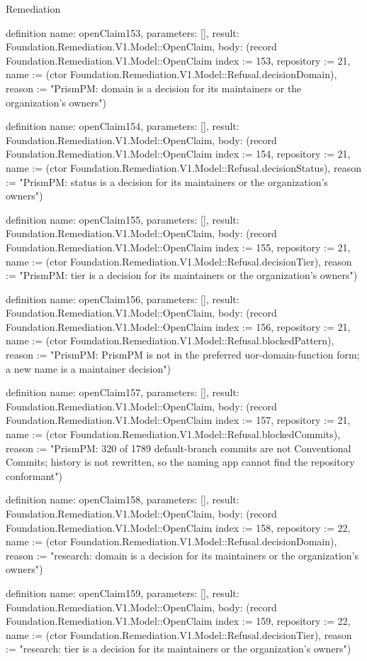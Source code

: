 \begin{lexlean}{Remediation}
\begin{semanticmodule}
definition{
  name: openClaim153,
  parameters: [],
  result: Foundation.Remediation.V1.Model::OpenClaim,
  body: (record Foundation.Remediation.V1.Model::OpenClaim {index := 153, repository := 21, name := (ctor Foundation.Remediation.V1.Model::Refusal.decisionDomain), reason := "PrismPM: domain is a decision for its maintainers or the organization's owners"})
}

definition{
  name: openClaim154,
  parameters: [],
  result: Foundation.Remediation.V1.Model::OpenClaim,
  body: (record Foundation.Remediation.V1.Model::OpenClaim {index := 154, repository := 21, name := (ctor Foundation.Remediation.V1.Model::Refusal.decisionStatus), reason := "PrismPM: status is a decision for its maintainers or the organization's owners"})
}

definition{
  name: openClaim155,
  parameters: [],
  result: Foundation.Remediation.V1.Model::OpenClaim,
  body: (record Foundation.Remediation.V1.Model::OpenClaim {index := 155, repository := 21, name := (ctor Foundation.Remediation.V1.Model::Refusal.decisionTier), reason := "PrismPM: tier is a decision for its maintainers or the organization's owners"})
}

definition{
  name: openClaim156,
  parameters: [],
  result: Foundation.Remediation.V1.Model::OpenClaim,
  body: (record Foundation.Remediation.V1.Model::OpenClaim {index := 156, repository := 21, name := (ctor Foundation.Remediation.V1.Model::Refusal.blockedPattern), reason := "PrismPM: PrismPM is not in the preferred uor-{domain}-{function} form; a new name is a maintainer decision"})
}

definition{
  name: openClaim157,
  parameters: [],
  result: Foundation.Remediation.V1.Model::OpenClaim,
  body: (record Foundation.Remediation.V1.Model::OpenClaim {index := 157, repository := 21, name := (ctor Foundation.Remediation.V1.Model::Refusal.blockedCommits), reason := "PrismPM: 320 of 1789 default-branch commits are not Conventional Commits; history is not rewritten, so the naming app cannot find the repository conformant"})
}

definition{
  name: openClaim158,
  parameters: [],
  result: Foundation.Remediation.V1.Model::OpenClaim,
  body: (record Foundation.Remediation.V1.Model::OpenClaim {index := 158, repository := 22, name := (ctor Foundation.Remediation.V1.Model::Refusal.decisionDomain), reason := "research: domain is a decision for its maintainers or the organization's owners"})
}

definition{
  name: openClaim159,
  parameters: [],
  result: Foundation.Remediation.V1.Model::OpenClaim,
  body: (record Foundation.Remediation.V1.Model::OpenClaim {index := 159, repository := 22, name := (ctor Foundation.Remediation.V1.Model::Refusal.decisionTier), reason := "research: tier is a decision for its maintainers or the organization's owners"})
}


\end{semanticmodule}
\end{lexlean}

